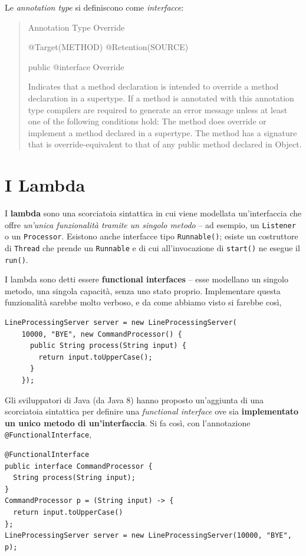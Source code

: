 \documentclass[\fontsizeclass,twocolumn]{\classname}
\theoremstyle{definition}
\theoremstyle{definition}
\begin{document}
Le \emph{annotation type} si definiscono come \emph{interfacce}:
\begin{quote}
    \footnotesize{Annotation Type Override

@Target(METHOD)
@Retention(SOURCE)

public @interface Override

Indicates that a method declaration is intended to override a method declaration in a supertype. If a method is annotated with this annotation type compilers are required to generate an error message unless at least one of the following conditions hold:
The method does override or implement a method declared in a supertype.
The method has a signature that is override-equivalent to that of any public method declared in Object.}
\end{quote}

\section{I Lambda}

I \textbf{lambda} sono una scorciatoia sintattica in cui viene modellata
un'interfaccia che offre \emph{un'unica funzionalità tramite un singolo
metodo} -- ad esempio, un \texttt{Listener} o un \texttt{Processor}. Esistono
anche interfacce tipo \texttt{Runnable()}; esiste un costruttore di
\texttt{Thread} che prende un \texttt{Runnable} e di cui all'invocazione di
\texttt{start()} ne esegue il \texttt{run()}.

I lambda sono detti essere \textbf{functional interfaces} -- esse modellano un
singolo metodo, una singola capacità, senza uno stato proprio. Implementare
questa funzionalità sarebbe molto verboso, e da come abbiamo visto si farebbe
così,

\begin{lstlisting}
LineProcessingServer server = new LineProcessingServer(
    10000, "BYE", new CommandProcessor() {
      public String process(String input) {
        return input.toUpperCase();
      }
    });
\end{lstlisting}

Gli sviluppatori di Java (da Java 8) hanno proposto un'aggiunta di una
scorciatoia sintattica per definire una \emph{functional interface} ove sia
\textbf{implementato un unico metodo di un'interfaccia}. Si fa così, con
l'annotazione \texttt{@Functional\-Interface},

\begin{lstlisting}
@FunctionalInterface
public interface CommandProcessor {
  String process(String input);
}
CommandProcessor p = (String input) -> {
  return input.toUpperCase()
};
LineProcessingServer server = new LineProcessingServer(10000, "BYE", p);
\end{lstlisting}
\end{document}
